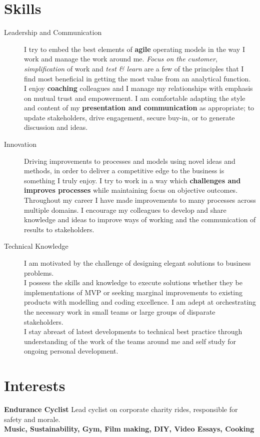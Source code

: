\documentclass[11pt]{article}
\begin{document}
\section*{Skills}
\begin{description}
\item[Leadership and Communication] I try to embed the best elements of \textbf{agile} operating models in the way I work and manage the work around me.  \emph{Focus on the customer}, \emph{simplification} of work and \emph{test \& learn} are a few of the principles that I find most beneficial in getting the most value from an analytical function.\\
I enjoy \textbf{coaching} colleagues and I manage my relationships with emphasis on mutual trust and empowerment.
I am comfortable adapting the style and content of my \textbf{presentation and communication} as appropriate; to update stakeholders, drive engagement, secure buy-in, or to generate discussion and ideas. 
\item[Innovation] Driving improvements to processes and models using novel ideas and methods, in order to deliver a competitive edge to the business is something I truly enjoy. 
I try to work in a way which \textbf{challenges and improves processes} while maintaining focus on objective outcomes.\\
Throughout my career I have made improvements to many processes across multiple domains. I encourage my colleagues to develop and share knowledge and ideas to improve ways of working and the communication of results to stakeholders.
\item[Technical Knowledge] I am motivated by the challenge of designing elegant solutions to business problems.\\I possess the skills and knowledge to execute solutions whether they be implementations of MVP or seeking marginal improvements to existing products with modelling and coding excellence. I am adept at orchestrating the necessary work in small teams or large groups of disparate stakeholders.\\
I stay abreast of latest developments to technical best practice through understanding of the work of the teams around me and self study for ongoing personal development.\\
\end{description} 

\section*{Interests}

\textbf{Endurance Cyclist} Lead cyclist on corporate charity rides, responsible for safety and morale.\\
\textbf{Music, Sustainability, Gym, Film making,  DIY, Video Essays, Cooking}
\end{document}
